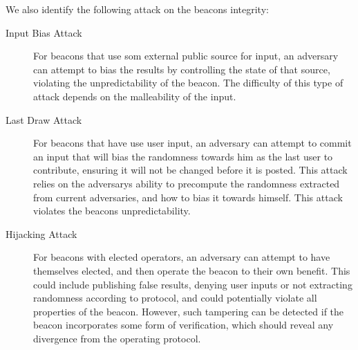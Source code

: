 We also identify the following attack on the beacons integrity:

\begin{description}
    \item [ Input Bias Attack ] For beacons that use som external public source for input, an adversary can attempt to bias the results by controlling the state of that source, violating the unpredictability of the beacon. The difficulty of this type of attack depends on the malleability of the input.
    \item [ Last Draw Attack ] For beacons that have use user input, an adversary can attempt to commit an input that will bias the randomness towards him as the last user to contribute, ensuring it will not be changed before it is posted. This attack relies on the adversarys ability to precompute the randomness extracted from current adversaries, and how to bias it towards himself. This attack violates the beacons unpredictability.
    \item [ Hijacking Attack ] For beacons with elected operators, an adversary can attempt to have themselves elected, and then operate the beacon to their own benefit. This could include publishing false results, denying user inputs or not extracting randomness according to protocol, and could potentially violate all properties of the beacon. However, such tampering can be detected if the beacon incorporates some form of verification, which should reveal any divergence from the operating protocol.

\end{description}
